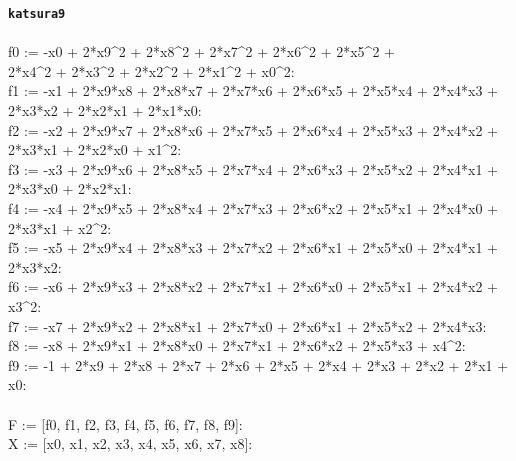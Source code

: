 \documentclass[letterpaper,12pt,titlepage,oneside,final]{book}
\newenvironment{codefont}{\footnotesize\ttfamily}{\par}
\begin{document}
\begin{appendices}
\noindent\textbf{\texttt{katsura9}}\\\\
\noindent\begin{codefont}
f0 := -x0 + 2*x9\^{}2 + 2*x8\^{}2 + 2*x7\^{}2 + 2*x6\^{}2 + 2*x5\^{}2 + \\2*x4\^{}2 + 2*x3\^{}2 + 2*x2\^{}2 + 2*x1\^{}2 + x0\^{}2:
\\
f1 := -x1 + 2*x9*x8 + 2*x8*x7 + 2*x7*x6 + 2*x6*x5 + 2*x5*x4 + 2*x4*x3 + \\2*x3*x2 + 2*x2*x1 + 2*x1*x0:
\\
f2 := -x2 + 2*x9*x7 + 2*x8*x6 + 2*x7*x5 + 2*x6*x4 + 2*x5*x3 + 2*x4*x2 + \\2*x3*x1 + 2*x2*x0 + x1\^{}2:
\\
f3 := -x3 + 2*x9*x6 + 2*x8*x5 + 2*x7*x4 + 2*x6*x3 + 2*x5*x2 + 2*x4*x1 + \\2*x3*x0 + 2*x2*x1:
\\
f4 := -x4 + 2*x9*x5 + 2*x8*x4 + 2*x7*x3 + 2*x6*x2 + 2*x5*x1 + 2*x4*x0 + \\2*x3*x1 + x2\^{}2:
\\
f5 := -x5 + 2*x9*x4 + 2*x8*x3 + 2*x7*x2 + 2*x6*x1 + 2*x5*x0 + 2*x4*x1 + \\2*x3*x2:
\\
f6 := -x6 + 2*x9*x3 + 2*x8*x2 + 2*x7*x1 + 2*x6*x0 + 2*x5*x1 + 2*x4*x2 + x3\^{}2:
\\
f7 := -x7 + 2*x9*x2 + 2*x8*x1 + 2*x7*x0 + 2*x6*x1 + 2*x5*x2 + 2*x4*x3:
\\
f8 := -x8 + 2*x9*x1 + 2*x8*x0 + 2*x7*x1 + 2*x6*x2 + 2*x5*x3 + x4\^{}2:
\\
f9 := -1 + 2*x9 + 2*x8 + 2*x7 + 2*x6 + 2*x5 + 2*x4 + 2*x3 + 2*x2 + 2*x1 + x0:
\\
\\
F := [f0, f1, f2, f3, f4, f5, f6, f7, f8, f9]:
\\
X := [x0, x1, x2, x3, x4, x5, x6, x7, x8]:\\
\end{codefont}


\end{appendices}
\end{document}

